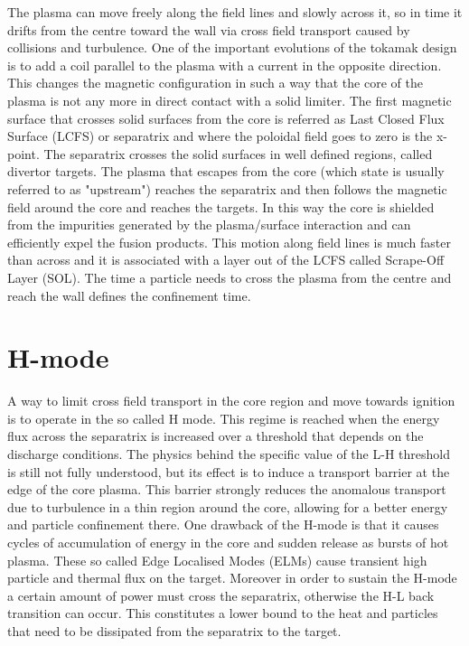 The plasma can move freely along the field lines and slowly across it, so in time it drifts from the centre toward the wall via cross field transport caused by collisions and turbulence. One of the important evolutions of the tokamak design is to add a coil parallel to the plasma with a current in the opposite direction. This changes the magnetic configuration in such a way that the core of the plasma is not any more in direct contact with a solid limiter. The first magnetic surface that crosses solid surfaces from the core is referred as Last Closed Flux Surface (LCFS) or separatrix and where the poloidal field goes to zero is the x-point. The separatrix crosses the solid surfaces in well defined regions, called divertor targets. The plasma that escapes from the core (which state is usually referred to as "upstream") reaches the separatrix and then follows the magnetic field around the core and reaches the targets. In this way the core is shielded from the impurities generated by the plasma/surface interaction and can efficiently expel the fusion products. This motion along field lines is much faster than across and it is associated with a layer out of the LCFS called Scrape-Off Layer (SOL). The time a particle needs to cross the plasma from the centre and reach the wall defines the confinement time.

\section{H-mode}
A way to limit cross field transport in the core region and move towards ignition is to operate in the so called H mode. This regime is reached when the energy flux across the separatrix is increased over a threshold that depends on the discharge conditions.\cite{Ryter1998} The physics behind the specific value of the L-H threshold is still not fully understood, but its effect is to induce a transport barrier at the edge of the core plasma. This barrier strongly reduces the anomalous transport due to turbulence in a thin region around the core, allowing for a better energy and particle confinement there. One drawback of the H-mode is that it causes cycles of accumulation of energy in the core and sudden release as bursts of hot plasma. These so called Edge Localised Modes (ELMs) cause transient high particle and thermal flux on the target. Moreover in order to sustain the H-mode a certain amount of power must cross the separatrix, otherwise the H-L back transition can occur. This constitutes a lower bound to the heat and particles that need to be dissipated from the separatrix to the target.

